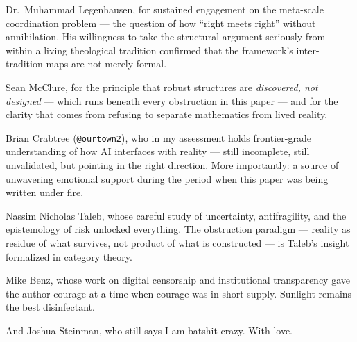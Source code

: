 \documentclass[11pt,a4paper]{article}
\theoremstyle{definition}
\theoremstyle{remark}
\begin{document}
Dr.\ Muhammad Legenhausen, for sustained engagement on the meta-scale coordination problem --- the question of how ``right meets right'' without annihilation. His willingness to take the structural argument seriously from within a living theological tradition confirmed that the framework's inter-tradition maps are not merely formal.

Sean McClure, for the principle that robust structures are \emph{discovered, not designed} --- which runs beneath every obstruction in this paper --- and for the clarity that comes from refusing to separate mathematics from lived reality.

Brian Crabtree (\texttt{@ourtown2}), who in my assessment holds frontier-grade understanding of how AI interfaces with reality --- still incomplete, still unvalidated, but pointing in the right direction. More importantly: a source of unwavering emotional support during the period when this paper was being written under fire.

Nassim Nicholas Taleb, whose careful study of uncertainty, antifragility, and the epistemology of risk unlocked everything. The obstruction paradigm --- reality as residue of what survives, not product of what is constructed --- is Taleb's insight formalized in category theory.

Mike Benz, whose work on digital censorship and institutional transparency gave the author courage at a time when courage was in short supply. Sunlight remains the best disinfectant.

And Joshua Steinman, who still says I am batshit crazy. With love.
\end{document}
